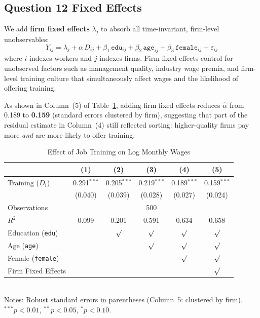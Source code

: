 \documentclass[paper=a4, fontsize=11pt]{scrartcl}
\begin{document}
\subsection*{Question 12 \quad Fixed Effects}

We add \textbf{firm fixed effects} $\lambda_j$ to absorb all time-invariant,
firm-level unobservables:
\begin{equation}
  Y_{ij} = \lambda_j + \alpha \, D_{ij}
         + \beta_1\,\texttt{edu}_{ij} + \beta_2\,\texttt{age}_{ij}
         + \beta_3\,\texttt{female}_{ij} + \varepsilon_{ij}
  \label{eq:fe}
\end{equation}
where $i$ indexes workers and $j$ indexes firms.
Firm fixed effects control for unobserved factors such as management quality,
industry wage premia, and firm-level training culture that simultaneously affect
wages and the likelihood of offering training.

As shown in Column~(5) of Table~\ref{tab:reg}, adding firm fixed effects reduces
$\hat{\alpha}$ from 0.189 to \textbf{0.159} (standard errors clustered by firm),
suggesting that part of the residual estimate in Column~(4) still reflected
sorting: higher-quality firms pay more \emph{and} are more likely to offer training.

\begin{table}[h]
  \centering
  \caption{Effect of Job Training on Log Monthly Wages}
  \label{tab:reg}
  \begin{tabular}{@{}lccccc@{}}
    \toprule
                & (1)           & (2)           & (3)           & (4)           & (5)           \\
    \midrule\midrule
    Training ($D_i$)
                & 0.291$^{***}$ & 0.205$^{***}$ & 0.219$^{***}$ & 0.189$^{***}$ & 0.159$^{***}$ \\
                & (0.040)       & (0.039)       & (0.028)       & (0.027)       & (0.024)       \\
    \midrule\midrule
    Observations & \multicolumn{5}{c}{500}                                                      \\
    $R^{2}$      & 0.099         & 0.201         & 0.591         & 0.634         & 0.658         \\
    \midrule\midrule
    Education (\texttt{edu})     &          & $\surd$  & $\surd$  & $\surd$  & $\surd$  \\
    Age (\texttt{age})           &          &          & $\surd$  & $\surd$  & $\surd$  \\
    Female (\texttt{female})     &          &          &          & $\surd$  & $\surd$  \\
    Firm Fixed Effects           &          &          &          &          & $\surd$  \\
    \bottomrule
  \end{tabular}\\[4pt]
  {\small
   Notes: Robust standard errors in parentheses (Column~5: clustered by firm). \\
   $^{***}p<0.01$,\; $^{**}p<0.05$,\; $^{*}p<0.10$.}
\end{table}
\end{document}
